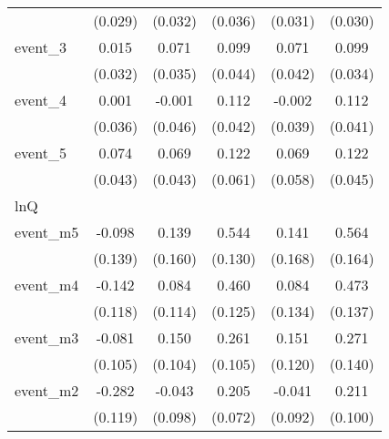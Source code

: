 {\begin{tabular}{l*{5}{c}}
            &     (0.029)         &     (0.032)         &     (0.036)         &     (0.031)         &     (0.030)         \\
[1em]
event\_3     &       0.015         &       0.071\sym{*}  &       0.099\sym{*}  &       0.071         &       0.099\sym{**} \\
            &     (0.032)         &     (0.035)         &     (0.044)         &     (0.042)         &     (0.034)         \\
[1em]
event\_4     &       0.001         &      -0.001         &       0.112\sym{**} &      -0.002         &       0.112\sym{**} \\
            &     (0.036)         &     (0.046)         &     (0.042)         &     (0.039)         &     (0.041)         \\
[1em]
event\_5     &       0.074         &       0.069         &       0.122\sym{*}  &       0.069         &       0.122\sym{**} \\
            &     (0.043)         &     (0.043)         &     (0.061)         &     (0.058)         &     (0.045)         \\
\hline
lnQ         &                     &                     &                     &                     &                     \\
event\_m5    &      -0.098         &       0.139         &       0.544\sym{***}&       0.141         &       0.564\sym{***}\\
            &     (0.139)         &     (0.160)         &     (0.130)         &     (0.168)         &     (0.164)         \\
[1em]
event\_m4    &      -0.142         &       0.084         &       0.460\sym{***}&       0.084         &       0.473\sym{***}\\
            &     (0.118)         &     (0.114)         &     (0.125)         &     (0.134)         &     (0.137)         \\
[1em]
event\_m3    &      -0.081         &       0.150         &       0.261\sym{*}  &       0.151         &       0.271         \\
            &     (0.105)         &     (0.104)         &     (0.105)         &     (0.120)         &     (0.140)         \\
[1em]
event\_m2    &      -0.282\sym{*}  &      -0.043         &       0.205\sym{**} &      -0.041         &       0.211\sym{*}  \\
            &     (0.119)         &     (0.098)         &     (0.072)         &     (0.092)         &     (0.100)         \\

\end{tabular}}

